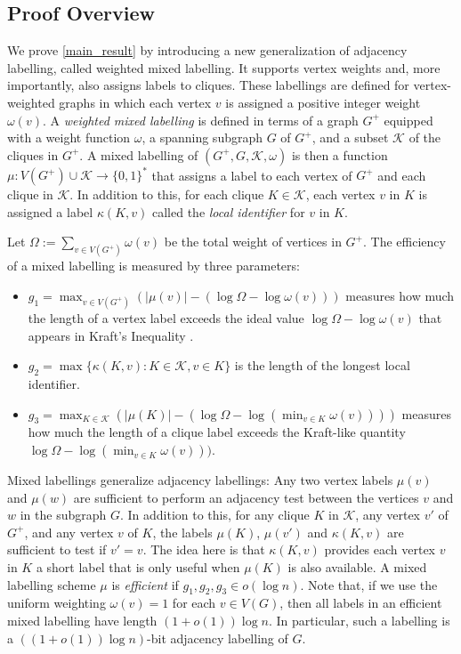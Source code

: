 \documentclass{patmorin}
\newcommand{\defin}[1]{\emph{\textcolor{brightmaroon}{#1}}}
\begin{document}
\subsection{Proof Overview}
\label{ssec:overview}


We prove \cref{main_result} by introducing a new generalization of adjacency labelling, called weighted mixed labelling. It supports vertex weights and, more importantly, also assigns labels to cliques. These labellings are defined for vertex-weighted graphs in which each vertex $v$ is assigned a positive integer weight $\omega(v)$.  A \defin{weighted mixed labelling} is defined in terms of a graph $G^+$ equipped with a weight function $\omega$, a spanning subgraph $G$ of $G^+$, and a subset $\mathcal{K}$ of the cliques in $G^+$. A mixed labelling of $(G^+,G,\mathcal{K},\omega)$ is then a function $\mu:V(G^+)\cup\mathcal{K}\to\{0,1\}^*$ that assigns a label to each vertex of $G^+$ and each clique in $\mathcal{K}$.  In addition to this, for each clique $K\in\mathcal{K}$, each vertex $v$ in $K$ is assigned a label $\kappa(K,v)$ called the \defin{local identifier} for $v$ in $K$.

Let $\Omega:=\sum_{v\in V(G^+)}\omega(v)$ be the total weight of vertices in $G^+$.  The efficiency of a mixed labelling is measured by three parameters:
\begin{itemize}
    \item $g_1=\max_{v\in V(G^+)} (|\mu(v)|-(\log\Omega - \log\omega(v)))$ measures how much the length of a vertex label exceeds the ideal value $\log\Omega-\log\omega(v)$ that appears in Kraft's Inequality \cite{Kraft1949}.
    \item $g_2=\max\{\kappa(K,v):K\in\mathcal{K}, v\in K\}$ is the length of the longest local identifier.
    \item $g_3=\max_{K\in\mathcal{K}} (|\mu(K)|-(\log\Omega - \log(\min_{v\in K}\omega(v))))$ measures how much the length of a clique label exceeds the Kraft-like quantity $\log\Omega - \log(\min_{v\in K}\omega(v)))$.
\end{itemize}


Mixed labellings generalize adjacency labellings: Any two vertex labels $\mu(v)$ and $\mu(w)$ are sufficient to perform an adjacency test between the vertices $v$ and $w$ in the subgraph $G$.  In addition to this, for any clique $K$ in $\mathcal{K}$, any vertex $v'$ of $G^+$, and any vertex $v$ of $K$, the labels $\mu(K)$, $\mu(v')$ and $\kappa(K,v)$ are sufficient to test if $v'=v$.  The idea here is that $\kappa(K,v)$ provides each vertex $v$ in $K$ a short label that is only useful when $\mu(K)$ is also available.   A mixed labelling scheme $\mu$ is \defin{efficient} if $g_1,g_2,g_3\in o(\log n)$.  Note that, if we use the uniform weighting $\omega(v)=1$ for each $v\in V(G)$, then all labels in an efficient mixed labelling have length $(1+o(1))\log n$.  In particular, such a labelling is a $((1+o(1))\log n)$-bit adjacency labelling of $G$.
\end{document}
